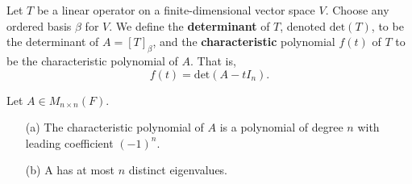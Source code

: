 \begin{definition}
    Let \( T  \) be a linear operator on a finite-dimensional vector space \( V  \). Choose any ordered basis \( \beta  \) for \( V  \). We define the \textbf{determinant} of \( T  \), denoted \( \text{det}(T) \), to be the determinant of \( A = [T]_{\beta}  \), and the \textbf{characteristic} polynomial \( f(t) \) of \( T  \) to be the characteristic polynomial of \( A  \). That is, 
    \[  f(t) = \text{det}(A - t {I}_{n}). \]
\end{definition}

\begin{theorem}
   Let \( A \in {M}_{n \times n}(F)  \).  
   \begin{enumerate}
       \item[(a)] The characteristic polynomial of \( A  \) is a polynomial of degree \( n  \) with leading coefficient \( (-1)^{n} \).
        \item[(b)] A has at most \( n  \) distinct eigenvalues.
   \end{enumerate}
\end{theorem}
